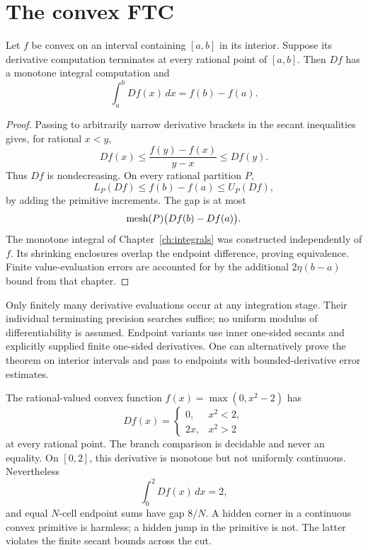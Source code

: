 \section{The convex FTC}
\begin{theorem}
\label{thm:convex-ftc}
Let $f$ be convex on an interval containing $[a,b]$ in its interior.
Suppose its derivative computation terminates at every rational point of
$[a,b]$.  Then $Df$ has a monotone integral computation and
\[
 \boxed{\int_a^b Df(x)\,dx=f(b)-f(a).}
\]
\end{theorem}
\begin{proof}
Passing to arbitrarily narrow derivative brackets in the secant inequalities
gives, for rational $x<y$,
\[
 Df(x)\le\frac{f(y)-f(x)}{y-x}\le Df(y).
\]
Thus $Df$ is nondecreasing.  On every rational partition $P$,
\[
 L_P(Df)\le f(b)-f(a)\le U_P(Df),
\]
by adding the primitive increments.  The gap is at most
\[
 \operatorname{mesh}(P)\bigl(Df(b)-Df(a)\bigr).
\]
The monotone integral of Chapter~\ref{ch:integrals} was constructed
independently of $f$.  Its shrinking enclosures overlap the endpoint
difference, proving equivalence.  Finite value-evaluation errors are
accounted for by the additional $2\eta(b-a)$ bound from that chapter.
\end{proof}

Only finitely many derivative evaluations occur at any integration stage.
Their individual terminating precision searches suffice; no uniform
modulus of differentiability is assumed.  Endpoint variants use inner
one-sided secants and explicitly supplied finite one-sided derivatives.
One can alternatively prove the theorem on interior intervals and pass to
endpoints with bounded-derivative error estimates.

\begin{example}
The rational-valued convex function $f(x)=\max(0,x^2-2)$ has
\[
 Df(x)=\begin{cases}0,&x^2<2,\\2x,&x^2>2\end{cases}
\]
at every rational point.  The branch comparison is decidable and never
an equality.  On $[0,2]$, this derivative is monotone but not uniformly
continuous.  Nevertheless
\[
 \int_0^2 Df(x)\,dx=2,
\]
and equal $N$-cell endpoint sums have gap $8/N$.  A hidden corner in a
continuous convex primitive is harmless; a hidden jump in the primitive
is not.  The latter violates the finite secant bounds across the cut.
\end{example}

